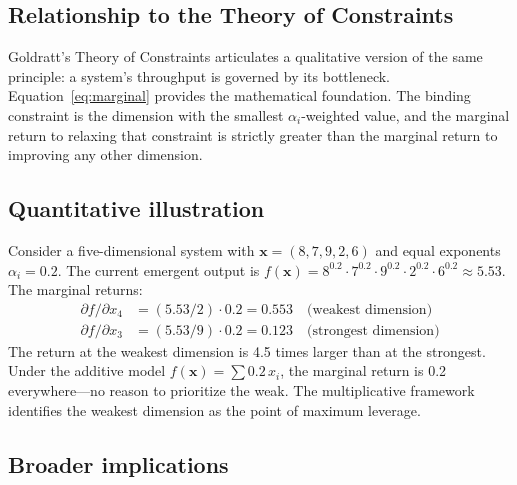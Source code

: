 \documentclass[12pt, a4paper]{article}
\theoremstyle{definition}
\theoremstyle{remark}
\begin{document}
\subsection{Relationship to the Theory of Constraints}

Goldratt's Theory of Constraints \cite{goldratt1984} articulates a qualitative version of the same principle: a system's throughput is governed by its bottleneck. Equation~\eqref{eq:marginal} provides the mathematical foundation. The binding constraint is the dimension with the smallest $\alpha_i$-weighted value, and the marginal return to relaxing that constraint is strictly greater than the marginal return to improving any other dimension.

\subsection{Quantitative illustration}

Consider a five-dimensional system with $\mathbf{x} = (8, 7, 9, 2, 6)$ and equal exponents $\alpha_i = 0.2$. The current emergent output is $f(\mathbf{x}) = 8^{0.2} \cdot 7^{0.2} \cdot 9^{0.2} \cdot 2^{0.2} \cdot 6^{0.2} \approx 5.53$. The marginal returns:
\begin{align*}
\partial f / \partial x_4 &= (5.53 / 2) \cdot 0.2 = 0.553 \quad \text{(weakest dimension)} \\
\partial f / \partial x_3 &= (5.53 / 9) \cdot 0.2 = 0.123 \quad \text{(strongest dimension)}
\end{align*}
The return at the weakest dimension is 4.5 times larger than at the strongest. Under the additive model $f(\mathbf{x}) = \sum 0.2 \, x_i$, the marginal return is 0.2 everywhere---no reason to prioritize the weak. The multiplicative framework identifies the weakest dimension as the point of maximum leverage.

\subsection{Broader implications}
\end{document}
